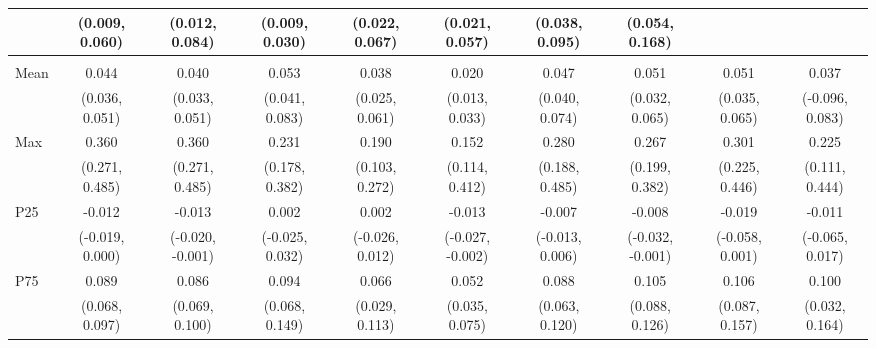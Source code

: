 {\begin{tabular}{l|c|c|c|c|c|c|c|c|c}
& {\scriptsize (0.009, 0.060)}
& {\scriptsize (0.012, 0.084)}
& {\scriptsize (0.009, 0.030)}
& {\scriptsize (0.022, 0.067)}
& {\scriptsize (0.021, 0.057)}
& {\scriptsize (0.038, 0.095)}
& {\scriptsize (0.054, 0.168)}
\\ [0.1cm]
\hline
\noalign{\smallskip}
\multicolumn{10}{l}{\textbf{Effect with Leads and Lags}} \\
\noalign{\smallskip}
\hline
Mean
& 0.044 & 0.040 & 0.053 & 0.038 & 0.020 & 0.047 & 0.051 & 0.051 & 0.037 \\
& {\scriptsize (0.036, 0.051)}
& {\scriptsize (0.033, 0.051)}
& {\scriptsize (0.041, 0.083)}
& {\scriptsize (0.025, 0.061)}
& {\scriptsize (0.013, 0.033)}
& {\scriptsize (0.040, 0.074)}
& {\scriptsize (0.032, 0.065)}
& {\scriptsize (0.035, 0.065)}
& {\scriptsize (-0.096, 0.083)}
\\ [0.1cm]
\hline
Max
& 0.360 & 0.360 & 0.231 & 0.190 & 0.152 & 0.280 & 0.267 & 0.301 & 0.225 \\
& {\scriptsize (0.271, 0.485)}
& {\scriptsize (0.271, 0.485)}
& {\scriptsize (0.178, 0.382)}
& {\scriptsize (0.103, 0.272)}
& {\scriptsize (0.114, 0.412)}
& {\scriptsize (0.188, 0.485)}
& {\scriptsize (0.199, 0.382)}
& {\scriptsize (0.225, 0.446)}
& {\scriptsize (0.111, 0.444)}
\\ [0.1cm]
\hline
P25
& -0.012 & -0.013 & 0.002 & 0.002 & -0.013 & -0.007 & -0.008 & -0.019 & -0.011 \\
& {\scriptsize (-0.019, 0.000)}
& {\scriptsize (-0.020, -0.001)}
& {\scriptsize (-0.025, 0.032)}
& {\scriptsize (-0.026, 0.012)}
& {\scriptsize (-0.027, -0.002)}
& {\scriptsize (-0.013, 0.006)}
& {\scriptsize (-0.032, -0.001)}
& {\scriptsize (-0.058, 0.001)}
& {\scriptsize (-0.065, 0.017)}
\\ [0.1cm]
\hline
P75
& 0.089 & 0.086 & 0.094 & 0.066 & 0.052 & 0.088 & 0.105 & 0.106 & 0.100 \\
& {\scriptsize (0.068, 0.097)}
& {\scriptsize (0.069, 0.100)}
& {\scriptsize (0.068, 0.149)}
& {\scriptsize (0.029, 0.113)}
& {\scriptsize (0.035, 0.075)}
& {\scriptsize (0.063, 0.120)}
& {\scriptsize (0.088, 0.126)}
& {\scriptsize (0.087, 0.157)}
& {\scriptsize (0.032, 0.164)}
\\ [0.1cm]
\hline
\hline
\end{tabular}
}
